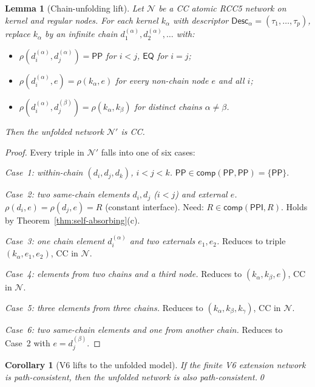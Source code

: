 \documentclass[a4paper,11pt]{article}
\newtheorem{lemma}[theorem]{Lemma}
\newtheorem{corollary}[theorem]{Corollary}
\theoremstyle{definition}
\newcommand{\EQ}{\ensuremath{\mathsf{EQ}}}
\newcommand{\PP}{\ensuremath{\mathsf{PP}}}
\newcommand{\PPI}{\ensuremath{\mathsf{PPI}}}
\newcommand{\comp}{\ensuremath{\mathsf{comp}}}
\newcommand{\Desc}{\ensuremath{\mathsf{Desc}}}
\begin{document}
\begin{lemma}[Chain-unfolding lift]\label{lem:lift}
Let $\mathcal{N}$ be a CC atomic RCC5 network on kernel and regular
nodes.  For each kernel $k_\alpha$ with descriptor
$\Desc_\alpha = (\tau_1, \ldots, \tau_p)$, replace $k_\alpha$ by an
infinite chain $d_1^{(\alpha)}, d_2^{(\alpha)}, \ldots$ with:
\begin{itemize}
\item $\rho(d_i^{(\alpha)}, d_j^{(\alpha)}) = \PP$ for $i < j$,
  $\EQ$ for $i = j$;
\item $\rho(d_i^{(\alpha)}, e) = \rho(k_\alpha, e)$ for every
  non-chain node $e$ and all $i$;
\item $\rho(d_i^{(\alpha)}, d_j^{(\beta)}) =
  \rho(k_\alpha, k_\beta)$ for distinct chains $\alpha \ne \beta$.
\end{itemize}
Then the unfolded network $\mathcal{N}'$ is CC.
\end{lemma}

\begin{proof}
Every triple in $\mathcal{N}'$ falls into one of six cases:

\emph{Case~1: within-chain $(d_i, d_j, d_k)$, $i < j < k$.}\;
$\PP \in \comp(\PP, \PP) = \{\PP\}$. \checkmark

\emph{Case~2: two same-chain elements $d_i, d_j$ ($i < j$) and
external $e$.}\;
$\rho(d_i, e) = \rho(d_j, e) = R$ (constant interface).
Need: $R \in \comp(\PPI, R)$.  Holds by
Theorem~\ref{thm:self-absorbing}(c). \checkmark

\emph{Case~3: one chain element $d_i^{(\alpha)}$ and two externals
$e_1, e_2$.}\;
Reduces to triple $(k_\alpha, e_1, e_2)$, CC in $\mathcal{N}$.
\checkmark

\emph{Case~4: elements from two chains and a third node.}\;
Reduces to $(k_\alpha, k_\beta, e)$, CC in $\mathcal{N}$. \checkmark

\emph{Case~5: three elements from three chains.}\;
Reduces to $(k_\alpha, k_\beta, k_\gamma)$, CC in $\mathcal{N}$.
\checkmark

\emph{Case~6: two same-chain elements and one from another chain.}\;
Reduces to Case~2 with $e = d_j^{(\beta)}$. \checkmark
\end{proof}

\begin{corollary}[V6 lifts to the unfolded model]\label{cor:lift}
If the finite V6 extension network is path-consistent, then the
unfolded network is also path-consistent.\qed
\end{corollary}
\end{document}
